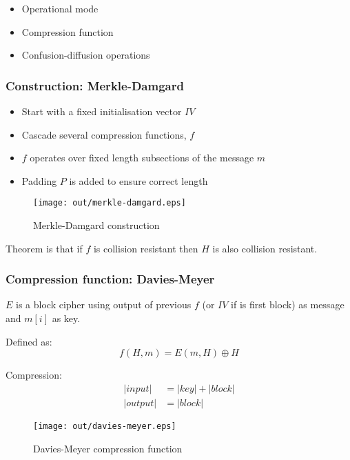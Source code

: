 \documentclass[a4paper]{article}
\begin{document}
\begin{itemize}
  \item Operational mode
  \item Compression function
  \item Confusion-diffusion operations
\end{itemize}

\subsubsection{Construction: Merkle-Damgard}

\begin{itemize}
  \item Start with a fixed initialisation vector $IV$
  \item Cascade several compression functions, $f$
  \item $f$ operates over fixed length subsections of the message $m$
  \item Padding $P$ is added to ensure correct length
\end{itemize}

\begin{figure}[h!]
  \centering
  \texttt{[image: out/merkle-damgard.eps]}
  \caption{Merkle-Damgard construction}
  \label{fig:merkle-damgard}
\end{figure}
\FloatBarrier

Theorem is that if $f$ is collision resistant then $H$ is also collision
resistant.

\subsubsection{Compression function: Davies-Meyer}

$E$ is a block cipher using output of previous $f$ (or $IV$ if is first block)
as message and $m[i]$ as key.

Defined as:
\[
  f(H, m) = E(m, H) \oplus H
\]

Compression:
\begin{align*}
   |input| &= |key| + |block| \\
  |output| &= |block|
\end{align*}

\begin{figure}[h!]
  \centering
  \texttt{[image: out/davies-meyer.eps]}
  \caption{Davies-Meyer compression function}
  \label{fig:davies-meyer}
\end{figure}
\FloatBarrier
\end{document}
